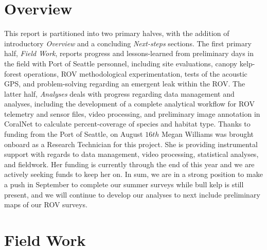 \documentclass[11pt]{article}
\begin{document}
\section{Overview}
\label{Overview}
This report is partitioned into two primary halves, with the addition of introductory \textit{Overview} and a concluding \textit{Next-steps} sections. 
The first primary half, \textit{Field Work}, reports progress and lessons-learned from preliminary days in the field with Port of Seattle personnel, including site evaluations, canopy kelp-forest operations, ROV methodological experimentation, tests of the acoustic GPS, and problem-solving regarding an emergent leak within the ROV. 
The latter half, \textit{Analyses} deals with progress regarding data management and analyses, including the development of a complete analytical workflow for ROV telemetry and sensor files, video processing, and preliminary image annotation in CoralNet to calculate percent-coverage of species and habitat type.  
Thanks to funding from the Port of Seattle, on August $16th$ Megan 
Williams was brought onboard as a Research Technician for this project. 
She is providing instrumental support with regards to data management, 
video processing, statistical analyses, and fieldwork. 
Her funding is currently through the end of this year and we are 
actively seeking funds to keep her on.  
In sum, we are in a strong position to make a push in September to complete our summer surveys while bull kelp is still present, and we will continue to develop our analyses to next include preliminary maps of our ROV surveys.




\section{Field Work}
\label{Field Work}
\end{document}
